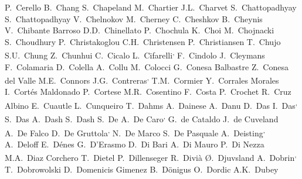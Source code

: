 \begin{flushleft}
P.~Cerello\And
B.~Chang\And
S.~Chapeland\And
M.~Chartier\And
J.L.~Charvet\And
S.~Chattopadhyay\And
S.~Chattopadhyay\And
V.~Chelnokov\And
M.~Cherney\And
C.~Cheshkov\And
B.~Cheynis\And
V.~Chibante Barroso\And
D.D.~Chinellato\And
P.~Chochula\And
K.~Choi\And
M.~Chojnacki\And
S.~Choudhury\And
P.~Christakoglou\And
C.H.~Christensen\And
P.~Christiansen\And
T.~Chujo\And
S.U.~Chung\And
Z.~Chunhui\And
C.~Cicalo\And
L.~Cifarelli\textsuperscript{,}\And
F.~Cindolo\And
J.~Cleymans\And
F.~Colamaria\And
D.~Colella\And
A.~Collu\And
M.~Colocci\And
G.~Conesa Balbastre\And
Z.~Conesa del Valle\And
M.E.~Connors\And
J.G.~Contreras\textsuperscript{,}\And
T.M.~Cormier\And
Y.~Corrales Morales\And
I.~Cort\'{e}s Maldonado\And
P.~Cortese\And
M.R.~Cosentino\And
F.~Costa\And
P.~Crochet\And
R.~Cruz Albino\And
E.~Cuautle\And
L.~Cunqueiro\And
T.~Dahms\And
A.~Dainese\And
A.~Danu\And
D.~Das\And
I.~Das\textsuperscript{,}\And
S.~Das\And
A.~Dash\And
S.~Dash\And
S.~De\And
A.~De Caro\textsuperscript{,}\And
G.~de Cataldo\And
J.~de Cuveland\And
A.~De Falco\And
D.~De Gruttola\textsuperscript{,}\And
N.~De Marco\And
S.~De Pasquale\And
A.~Deisting\textsuperscript{,}\And
A.~Deloff\And
E.~D\'{e}nes\And
G.~D'Erasmo\And
D.~Di Bari\And
A.~Di Mauro\And
P.~Di Nezza\And
M.A.~Diaz Corchero\And
T.~Dietel\And
P.~Dillenseger\And
R.~Divi\`{a}\And
{\O}.~Djuvsland\And
A.~Dobrin\textsuperscript{,}\And
T.~Dobrowolski\And
D.~Domenicis Gimenez\And
B.~D\"{o}nigus\And
O.~Dordic\And
A.K.~Dubey\And

\end{flushleft}
